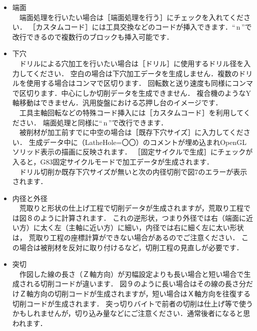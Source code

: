 \begin{itemize}
\item 端面\\
　端面処理を行いたい場合は［端面処理を行う］にチェックを入れてください．
［カスタムコード］には工具交換などのコードが挿入できます．``\,\yen{}n\,''で改行できるので複数行のブロックも挿入可能です．

\vspace*{1zh}
\item 下穴\\
　ドリルによる穴加工を行いたい場合は［ドリル］に使用するドリル径を入力してください．
空白の場合は下穴加工データを生成しません．複数のドリルを使用する場合はコンマで区切ります．
回転数と送り速度も同様にコンマで区切ります．中心にしか切削データを生成できません．
複合機のようなY軸移動はできません．汎用旋盤における芯押し台のイメージです．\\
　工具主軸回転などの特殊コード挿入には［カスタムコード］を利用してください．
端面処理と同様に``\,\yen{}n\,''で改行できます．\\
　被削材が加工前すでに中空の場合は［既存下穴サイズ］に入力してください．
生成データ中に（LatheHole=〇〇）のコメントが埋め込まれOpenGLソリッド表示の描画に反映されます．
［固定サイクルで生成］にチェックが入ると，G83固定サイクルモードで加工データが生成されます．\\
　ドリル切削か既存下穴サイズが無いと次の内径切削で図7のエラーが表示されます．


\vspace*{1zh}
\item 内径と外径\\
　荒取りと形状の仕上げ工程で切削データが生成されますが，荒取り工程では図８のように計算されます．
これの逆形状，つまり外径では右（端面に近い方）に太く左（主軸に近い方）に細い，内径では右に細く左に太い形状は，
荒取り工程の座標計算ができない場合があるのでご注意ください．
この場合は被削材を反対に取り付けるなど，切削工程の見直しが必要です．


\vspace*{1zh}
\item 突切\\
　作図した線の長さ（Ｚ軸方向）が刃幅設定よりも長い場合と短い場合で生成される切削コードが違います．
図９のように長い場合はその線の長さ分だけＺ軸方向の切削コードが生成されますが，短い場合はＸ軸方向を往復する切削コードが生成されます．
突っ切りバイトで前者の切削は仕上げ等で使うかもしれませんが，切り込み量などにご注意ください．通常後者になると思われます．


\end{itemize}
